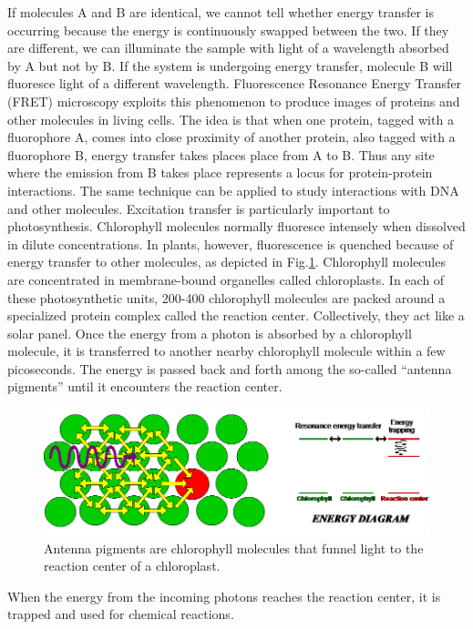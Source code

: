If molecules A and B are identical, we cannot tell whether energy transfer is occurring because the energy is continuously swapped between the two.  If they are different, we can illuminate the sample with light of a wavelength absorbed by A but not by B.  If the system is undergoing energy transfer, molecule B will fluoresce light of a different wavelength.  Fluorescence Resonance Energy Transfer (FRET) microscopy exploits this phenomenon to produce images of proteins and other molecules in living cells.  The idea is that when one protein, tagged with a fluorophore A, comes into close proximity of another protein, also tagged with a fluorophore B, energy transfer takes places place from A to B. Thus any site where the emission from B takes place represents a locus for protein-protein interactions. The same technique can be applied to study interactions with DNA and other molecules. 
Excitation transfer is particularly important to photosynthesis.  Chlorophyll molecules normally fluoresce intensely when dissolved in dilute concentrations.  In plants, however, fluorescence is quenched because of energy transfer to other molecules, as depicted in Fig.\ref{Fig7-9}.  Chlorophyll molecules are concentrated in membrane-bound organelles called chloroplasts.  In each of these photosynthetic units, 200-400 chlorophyll molecules are packed around a specialized protein complex called the reaction center.  Collectively, they act like a solar panel.  Once the energy from a photon is absorbed by a chlorophyll molecule, it is transferred to another nearby chlorophyll molecule within a few picoseconds.  The energy is passed back and forth among the so-called “antenna pigments” until it encounters the reaction center.
\begin{figure}[h]
	\centering
	\includegraphics[width=\textwidth]{./figures/Topic7/Fig7-9.png}
	\caption{Antenna pigments are chlorophyll molecules that funnel light to the reaction center of a chloroplast.}
	\label{Fig7-9}
\end{figure}
When the energy from the incoming photons reaches the reaction center, it is trapped and used for chemical reactions.
 
